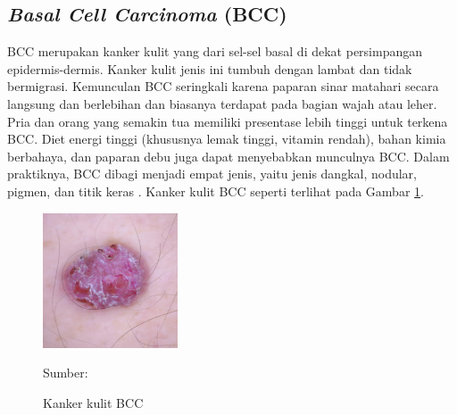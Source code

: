     \subsection{\textit{Basal Cell Carcinoma} (BCC)}
    BCC merupakan kanker kulit yang dari sel-sel basal di dekat persimpangan epidermis-dermis. Kanker kulit jenis ini tumbuh dengan lambat dan tidak bermigrasi. Kemunculan BCC seringkali karena paparan sinar matahari secara langsung dan berlebihan dan biasanya terdapat pada bagian wajah atau leher. Pria dan orang yang semakin tua memiliki presentase lebih tinggi untuk terkena BCC. Diet energi tinggi (khususnya lemak tinggi, vitamin rendah), bahan kimia berbahaya, dan paparan debu juga dapat menyebabkan munculnya BCC. Dalam praktiknya, BCC dibagi menjadi empat jenis, yaitu jenis dangkal, nodular, pigmen, dan titik keras \citep{Sang2019}. Kanker kulit BCC seperti terlihat pada Gambar \ref{fig:bcc}.
    \begin{figure}[H] 
        \begin{center} 
            \includegraphics[width=4cm]{../img/Skin Cancer BCC - Latex.jpg}
            \caption{Kanker kulit BCC} 
            \label{fig:bcc}
            Sumber: \citep{Codella2018,Combalia2019,Tschandl2018}
        \end{center} 
    \end{figure}

